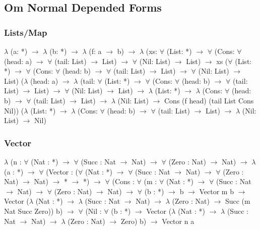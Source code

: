 \documentclass[11pt,oneside]{article}
\begin{document}
\newpage
\subsection*{Om Normal Depended Forms}
\vspace{1cm}
\subsubsection*{Lists/Map}
{\selectfont
\vspace{0.5cm}
$\lambda$ (a: *) $\rightarrow$ $\lambda$ (b: *) $\rightarrow$ $\lambda$ (f: a $\rightarrow$ b) $\rightarrow$ $\lambda$ (xs: $\forall$ (List: *)
$\rightarrow$ $\forall$ (Cons: $\forall$ (head: a) $\rightarrow$ $\forall$ (tail: List) $\rightarrow$ List) $\rightarrow$ $\forall$ (Nil: List) $\rightarrow$ List)
$\rightarrow$ xs ($\forall$ (List: *) $\rightarrow$ $\forall$ (Cons: $\forall$ (head: b) $\rightarrow$ $\forall$ (tail: List) $\rightarrow$ List)
$\rightarrow$ $\forall$ (Nil: List) $\rightarrow$ List) ($\lambda$ (head: a) $\rightarrow$ $\lambda$ (tail: $\forall$ (List: *) $\rightarrow$
$\forall$ (Cons: $\forall$ (head: b) $\rightarrow$ $\forall$ (tail: List) $\rightarrow$ List) $\rightarrow$ $\forall$ (Nil: List)
$\rightarrow$ List) $\rightarrow$ $\lambda$ (List: *) $\rightarrow$ $\lambda$ (Cons: $\forall$ (head: b) $\rightarrow$ $\forall$
(tail: List) $\rightarrow$ List) $\rightarrow$ $\lambda$ (Nil: List) $\rightarrow$ Cons (f head) (tail List Cons Nil))
($\lambda$ (List: *) $\rightarrow$ $\lambda$ (Cons: $\forall$ (head: b) $\rightarrow$ $\forall$ (tail: List) $\rightarrow$
List) $\rightarrow$ $\lambda$ (Nil: List) $\rightarrow$ Nil)
}

\subsubsection*{Vector}
{\selectfont
\vspace{0.5cm}
$\lambda$ (n : $\forall$ (Nat : *) $\rightarrow$ $\forall$ (Succ : Nat $\rightarrow$ Nat) $\rightarrow$ $\forall$ (Zero : Nat) $\rightarrow$ Nat) $\rightarrow$ $\lambda$ (a : *) $\rightarrow$ $\forall$ (Vector : ($\forall$ (Nat : *) $\rightarrow$ $\forall$ (Succ : Nat $\rightarrow$ Nat) $\rightarrow$ $\forall$ (Zero : Nat) $\rightarrow$ Nat) $\rightarrow$ * $\rightarrow$ *) $\rightarrow$ $\forall$ (Cons : $\forall$ (m : $\forall$ (Nat : *) $\rightarrow$ $\forall$ (Succ : Nat $\rightarrow$ Nat) $\rightarrow$ $\forall$ (Zero : Nat) $\rightarrow$ Nat) $\rightarrow$ $\forall$ (b : *) $\rightarrow$ b $\rightarrow$ Vector m b $\rightarrow$ Vector ($\lambda$ (Nat : *) $\rightarrow$ $\lambda$ (Succ : Nat $\rightarrow$ Nat) $\rightarrow$ $\lambda$ (Zero : Nat) $\rightarrow$ Succ (m Nat Succ Zero)) b) $\rightarrow$ $\forall$ (Nil : $\forall$ (b : *) $\rightarrow$ Vector ($\lambda$ (Nat : *) $\rightarrow$ $\lambda$ (Succ : Nat $\rightarrow$ Nat) $\rightarrow$ $\lambda$ (Zero : Nat) $\rightarrow$ Zero) b) $\rightarrow$ Vector n a
}
\end{document}
